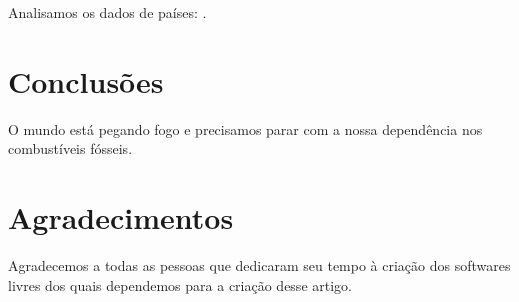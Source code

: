 \documentclass[twocolumn,A4]{article}
\begin{document}
Analisamos os dados de \NPaises{} países: \Paises{}.

%
%


\section{Conclusões}

O mundo está pegando fogo e precisamos parar com a nossa dependência nos
combustíveis fósseis.

\section*{Agradecimentos}

Agradecemos a todas as pessoas que dedicaram seu tempo à criação dos softwares
livres dos quais dependemos para a criação desse artigo.



\end{document}
